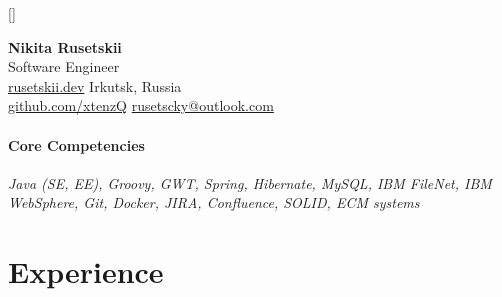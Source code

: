 \documentclass[10pt]{article}
\begin{document}
\titleformat{\section}{\vspace{-8pt}\scshape\raggedright\Large}{}{0em}{}[\color{black}\titlerule \vspace{-8pt}]


\noindent
\Large{\textbf{Nikita Rusetskii}}\vspace{4pt}
\\
\large{Software Engineer}\vspace{4pt}
\\
\normalsize\href{https://rusetskii.dev/}{rusetskii.dev}\normalsize
\hfill Irkutsk, Russia
\\
\href{https://github.com/xtenzQ}{github.com/xtenzQ}
\hfill
\href{mailto:rusetscky@outlook.com}{rusetscky@outlook.com}

\paragraph{\noindent\textbf{Core Competencies}\vspace{1pt}}\mbox{}\par\nobreak\noindent
\textit{Java (SE, EE), Groovy, GWT, Spring, Hibernate, MySQL, IBM FileNet, IBM WebSphere, Git, Docker, JIRA, Confluence, SOLID, ECM systems}



\section{Experience}
\paragraph{}
\end{document}
